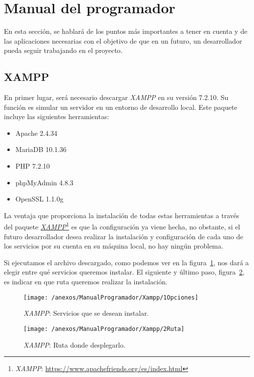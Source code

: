 \section{Manual del programador}

En esta sección, se hablará de los puntos más importantes a tener en cuenta y de las aplicaciones necesarias con el objetivo de que en un futuro, un desarrollador pueda seguir trabajando en el proyecto.

\subsection{XAMPP}

En primer lugar, será necesario descargar \textit{XAMPP} en su versión 7.2.10. Su función es simular un servidor en un entorno de desarrollo local. Este paquete incluye las siguientes herramientas:

\begin{itemize}
	\item Apache 2.4.34
	\item MariaDB 10.1.36
	\item PHP 7.2.10
	\item phpMyAdmin 4.8.3
	\item OpenSSL 1.1.0g
\end{itemize}

La ventaja que proporciona la instalación de todas estas herramientas a través del paquete \href{https://www.apachefriends.org/es/index.html}{\textit{XAMPP}}\footnote{\textit{XAMPP}: \url{https://www.apachefriends.org/es/index.html}} es que la configuración ya viene hecha, no obstante, si el futuro desarrollador desea realizar la instalación y configuración de cada uno de los servicios por su cuenta en su máquina local, no hay ningún problema.

Si ejecutamos el archivo descargado, como podemos ver en la figura~\ref{img:XAMPP_Opciones}, nos dará a elegir entre qué servicios queremos instalar. El siguiente y último paso, figura~\ref{img:XAMPP_Ruta}, es indicar en que ruta queremos realizar la instalación. 

\begin{figure}[h]
	\centering
	\texttt{[image: /anexos/ManualProgramador/Xampp/1Opciones]}
	\caption{\textit{XAMPP}: Servicios que se desean instalar.}
	\label{img:XAMPP_Opciones}
\end{figure}

\begin{figure}[h]
	\centering
	\texttt{[image: /anexos/ManualProgramador/Xampp/2Ruta]}
	\caption{\textit{XAMPP}: Ruta donde desplegarlo.}
	\label{img:XAMPP_Ruta}
\end{figure}

